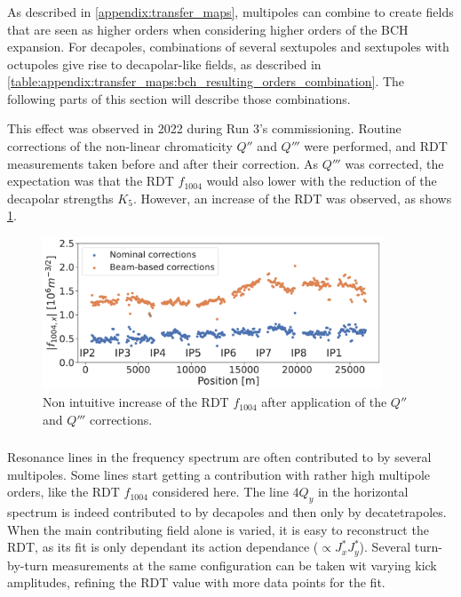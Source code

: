 \subsubsection{}

As described in \cref{appendix:transfer_maps}, multipoles can combine to create fields that are seen
as higher orders when considering higher orders of the BCH expansion.
For decapoles, combinations of several sextupoles and sextupoles with octupoles give rise to
decapolar-like fields, as described in
\cref{table:appendix:transfer_maps:bch_resulting_orders_combination}. The following parts of this
section will describe those combinations.

This effect was observed in 2022 during Run 3's commissioning. Routine corrections of the non-linear
chromaticity $Q''$ and $Q'''$ were performed, and RDT measurements taken before and after their
correction. As $Q'''$ was corrected, the expectation was that the RDT $f_{1004}$ would also lower
with the reduction of the decapolar strengths $K_5$. However, an increase of the RDT was observed,
as shows \cref{fig:decapoles:f1004_dq2_dq3}.

\begin{figure}[H]
    \centering
    \includegraphics[width=0.9\textwidth]{./images/f1004_dq2_dq3_2022.pdf}    
    \caption{Non intuitive increase of the RDT $f_{1004}$ after application of the $Q''$ and $Q'''$
    corrections.}
    \label{fig:decapoles:f1004_dq2_dq3}
\end{figure}


\subsubsection{}

Resonance lines in the frequency spectrum are often contributed to by several multipoles. Some lines
start getting a contribution with rather high multipole orders, like the RDT $f_{1004}$ considered
here. The line $4Q_y$ in the horizontal spectrum is indeed contributed to by decapoles and then only
by decatetrapoles. When the main contributing field alone is varied, it is easy to reconstruct the
RDT, as its fit is only dependant its action dependance ($\propto J_x^{*} J_y^{*}$). Several
turn-by-turn measurements at the same configuration can be taken wit varying kick amplitudes,
refining the RDT value with more data points for the fit.

